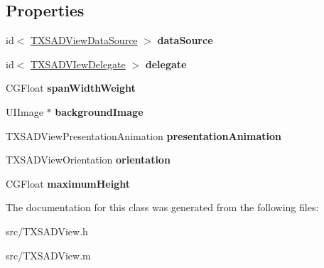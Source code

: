 \subsection*{Properties}
\begin{DoxyCompactItemize}
\item 
\hypertarget{interface_t_x_s_a_d_view_abb31d7971ea72b6cb1ae6833e66aff8d}{}id$<$ \hyperlink{protocol_t_x_s_a_d_view_data_source-p}{T\+X\+S\+A\+D\+View\+Data\+Source} $>$ {\bfseries data\+Source}\label{interface_t_x_s_a_d_view_abb31d7971ea72b6cb1ae6833e66aff8d}

\item 
\hypertarget{interface_t_x_s_a_d_view_ad6268cb97a122f97228087ed1610ab08}{}id$<$ \hyperlink{protocol_t_x_s_a_d_v_iew_delegate-p}{T\+X\+S\+A\+D\+V\+Iew\+Delegate} $>$ {\bfseries delegate}\label{interface_t_x_s_a_d_view_ad6268cb97a122f97228087ed1610ab08}

\item 
\hypertarget{interface_t_x_s_a_d_view_a069f5f1067a17e86dab2cd813442b4dd}{}C\+G\+Float {\bfseries span\+Width\+Weight}\label{interface_t_x_s_a_d_view_a069f5f1067a17e86dab2cd813442b4dd}

\item 
\hypertarget{interface_t_x_s_a_d_view_a3925a2f441e09c24bfc659178e2e7e20}{}U\+I\+Image $\ast$ {\bfseries background\+Image}\label{interface_t_x_s_a_d_view_a3925a2f441e09c24bfc659178e2e7e20}

\item 
\hypertarget{interface_t_x_s_a_d_view_af2064936cb4cd65583b35c2231994265}{}T\+X\+S\+A\+D\+View\+Presentation\+Animation {\bfseries presentation\+Animation}\label{interface_t_x_s_a_d_view_af2064936cb4cd65583b35c2231994265}

\item 
\hypertarget{interface_t_x_s_a_d_view_a2d0ba8f6f25b634d724d09eef5dc28e4}{}T\+X\+S\+A\+D\+View\+Orientation {\bfseries orientation}\label{interface_t_x_s_a_d_view_a2d0ba8f6f25b634d724d09eef5dc28e4}

\item 
\hypertarget{interface_t_x_s_a_d_view_a979ac293557b88491bbb2934343eb5db}{}C\+G\+Float {\bfseries maximum\+Height}\label{interface_t_x_s_a_d_view_a979ac293557b88491bbb2934343eb5db}

\end{DoxyCompactItemize}


The documentation for this class was generated from the following files\+:\begin{DoxyCompactItemize}
\item 
src/T\+X\+S\+A\+D\+View.\+h\item 
src/T\+X\+S\+A\+D\+View.\+m\end{DoxyCompactItemize}
